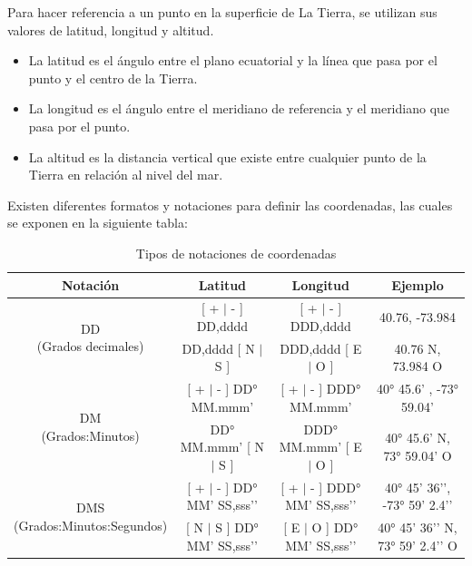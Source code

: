 Para hacer referencia a un punto en la superficie de La Tierra, se utilizan sus valores de latitud, longitud y altitud.
\begin{itemize}
  \item La latitud es el ángulo entre el plano ecuatorial y la línea que pasa por el punto y el centro de la Tierra. 
  \item La longitud es el ángulo entre el meridiano de referencia y el meridiano que pasa por el punto.
  \item La altitud es la distancia vertical que existe entre cualquier punto de la Tierra en relación al nivel del mar.
\end{itemize}

Existen diferentes formatos y notaciones para definir las coordenadas, las cuales se exponen en la siguiente tabla:
\renewcommand{\arraystretch}{2}
\begin{table}[h!]
  \tiny
  \centering
      \begin{tabular}{|c|c|c|c|} 
      \hline
      Notación & Latitud & Longitud & Ejemplo \\  \hline
      \multirow{2}{*}{
        \centering %
        \parbox{10em}{\hspace{1cm}DD\\(Grados decimales)}} & [ + $|$ - ] DD,dddd & [ + $|$ - ] DDD,dddd & 40.76, -73.984 \\ \cline{2-4} 
                               & DD,dddd [ N $|$ S ] & DDD,dddd [ E $|$ O ] & 40.76 N, 73.984 O \\ \hline
      \multirow{2}{*}{
        \centering %
        \parbox{10em}{\vspace{1mm}\hspace{0.9cm}DM\\(Grados:Minutos)\\}} & [ + $|$ - ] DD° MM.mmm’ & [ + $|$ - ] DDD° MM.mmm’ & 40° 45.6’ , -73° 59.04’ \\ \cline{2-4} 
                               & DD° MM.mmm’ [ N $|$ S ] & DDD° MM.mmm’ [ E $|$ O ] & 40° 45.6’ N, 73° 59.04’ O \\ \hline
      \multirow{2}{*}{
        \centering %
        \parbox{12em}{\vspace{1mm}\hspace{1.2cm}DMS\\(Grados:Minutos:Segundos)\\}} & [ + $|$ - ] DD° MM’ SS,sss’’ & [ + $|$ - ] DDD° MM’ SS,sss’’ & 40° 45’ 36’’, -73° 59’ 2.4’’ \\ \cline{2-4} 
                                & [ N $|$ S ] DD° MM’ SS,sss’’ & [ E $|$ O ] DD° MM’ SS,sss’’ & 40° 45’ 36’’ N, 73° 59’ 2.4’’ O \\ \hline
  \end{tabular}
  \caption{Tipos de notaciones de coordenadas}
  \label{tabla:coordFormats}
\end{table}  
\renewcommand{\arraystretch}{1}


